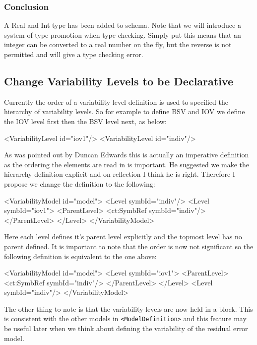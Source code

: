 \documentclass[a4paper,10pt]{article}
\newcommand{\xelem}[1]{\texttt{<#1>}\index{XML Element!\texttt{<#1>}}}
\newcommand{\watchout}{\marginpar{\hspace*{34pt}\raisebox{-0.5ex}{\Large\ding{43}}}}
\begin{document}
\subsubsection{Conclusion}

A Real and Int type has been added to schema. Note that we will
introduce a system of type promotion when type checking. \watchout Simply put
this means that an integer can be converted to a real number on the
fly, but the reverse is not permitted and will give a type checking error.

\subsection{Change Variability Levels to be Declarative}

Currently the order of a variability level definition is used to
specified the hierarchy of variability levels. So for example to
define BSV and IOV we define the IOV level first then the BSV level
next, as below:
%
\begin{xmlcode}
<VariabilityLevel id="iov1"/>
<VariabilityLevel id="indiv"/>
\end{xmlcode}

As was pointed out by Duncan Edwards this is actually an imperative
definition as the ordering the elements are read in is important. He
suggested we make the hierarchy definition explicit and on reflection
I think he is right. Therefore I propose we change the definition to
the following:
%
\begin{xmlcode}
<VariabilityModel id="model">
    <Level symbId="indiv"/>
    <Level symbId="iov1">
        <ParentLevel>
            <ct:SymbRef symbId="indiv"/>
        </ParentLevel>
    </Level>
</VariabilityModel>
\end{xmlcode}

Here each level defines it's parent level explicitly and the topmost
level has no parent defined. It is important to note that the order is
now not significant so the following definition is equivalent to the
one above:
%
\begin{xmlcode}
<VariabilityModel id="model">
    <Level symbId="iov1">
        <ParentLevel>
            <ct:SymbRef symbId="indiv"/>
        </ParentLevel>
    </Level>
    <Level symbId="indiv"/>
</VariabilityModel>
\end{xmlcode}
%
The other thing to note is that the variability levels are now held in
a block. This is consistent with the other models in
\xelem{ModelDefinition} and this feature may be useful later when we
think about defining the variability of the residual error model.
\end{document}
